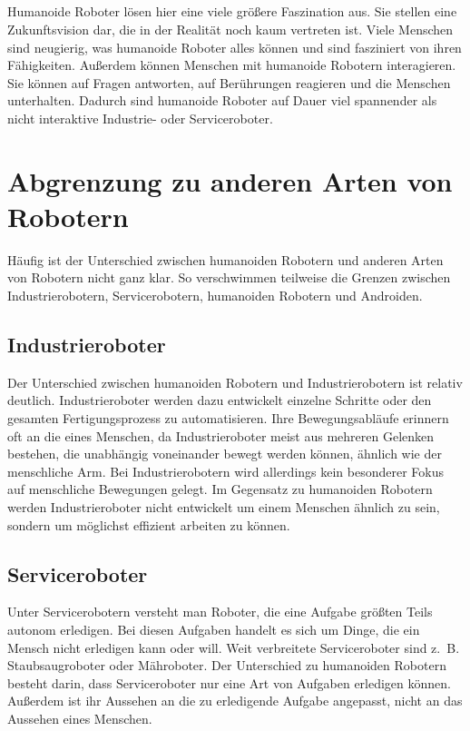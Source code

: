 \subparagraph{}
Humanoide Roboter lösen hier eine viele größere Faszination aus. Sie
stellen eine Zukunftsvision dar, die in der Realität noch kaum vertreten ist.
Viele Menschen sind neugierig, was humanoide Roboter alles können und sind
fasziniert von ihren Fähigkeiten. Außerdem können Menschen mit humanoide
Robotern interagieren. Sie können auf Fragen antworten, auf Berührungen
reagieren und die Menschen unterhalten. Dadurch sind humanoide Roboter auf
Dauer viel spannender als nicht interaktive Industrie- oder Serviceroboter.
\cite{Dautenhahn2011}

\section{Abgrenzung zu anderen Arten von Robotern}\label{sec:abgrenzung}
Häufig ist der Unterschied zwischen humanoiden Robotern und anderen Arten von
Robotern nicht ganz klar. So verschwimmen teilweise die Grenzen zwischen
Industrierobotern, Servicerobotern, humanoiden Robotern und Androiden.

\subsection{Industrieroboter}\label{sec:industrieroboter}
Der Unterschied zwischen humanoiden Robotern und Industrierobotern ist relativ
deutlich. Industrieroboter werden dazu entwickelt einzelne Schritte oder den
gesamten Fertigungsprozess zu automatisieren. Ihre Bewegungsabläufe erinnern oft
an die eines Menschen, da Industrieroboter meist aus mehreren Gelenken bestehen,
die unabhängig voneinander bewegt werden können, ähnlich wie der menschliche
Arm. \cite{Weber2017} Bei Industrierobotern wird allerdings kein besonderer
Fokus auf menschliche Bewegungen gelegt. Im Gegensatz zu humanoiden Robotern
werden Industrieroboter nicht entwickelt um einem Menschen ähnlich zu sein,
sondern um möglichst effizient arbeiten zu können.

\subsection{Serviceroboter}\label{sec:serviceroboter}
Unter Servicerobotern versteht man Roboter, die eine Aufgabe größten Teils
autonom erledigen. Bei diesen Aufgaben handelt es sich um Dinge, die ein Mensch
nicht erledigen kann oder will. Weit verbreitete Serviceroboter sind z.~B.
Staubsaugroboter oder Mähroboter. Der Unterschied zu humanoiden Robotern besteht
darin, dass Serviceroboter nur eine Art von Aufgaben erledigen können.
Außerdem ist ihr Aussehen an die zu erledigende Aufgabe angepasst, nicht an das
Aussehen eines Menschen.

